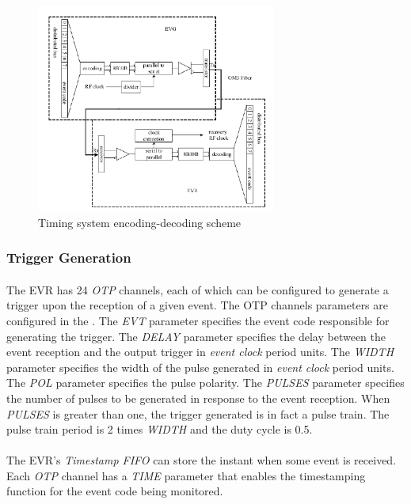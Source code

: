 \documentclass[openany]{article}
\begin{document}
			\begin{figure}[!h]
			\caption{Timing system encoding-decoding scheme}
			\label{fig:encoding-decoding}
			\centering
			\includegraphics[width=0.7\textwidth]{encoding-decoding-image}
			\end{figure}
\FloatBarrier

		\subsubsection{Trigger Generation}\label{sec:evr-trigger-generation}

			\paragraph{} The EVR has 24 \emph{OTP} channels, each of which can be configured to generate a trigger upon the reception of a given event. The OTP channels parameters are configured in the .
			The \emph{EVT} parameter specifies the event code responsible for generating the trigger.
			The \emph{DELAY} parameter specifies the delay between the event reception and the output trigger in \emph{event clock} period units.
			The \emph{WIDTH} parameter specifies the width of the pulse generated in \emph{event clock} period units.
			The \emph{POL} parameter specifies the pulse polarity.
			The \emph{PULSES} parameter specifies the number of pulses to be generated in response to the event reception. When \emph{PULSES} is greater than one, the trigger generated is in fact a pulse train. The pulse train period is 2 times \emph{WIDTH} and the duty cycle is 0.5.
			\paragraph{} The EVR's \emph{Timestamp FIFO} can store the instant when some event is received. Each \emph{OTP} channel has a \emph{TIME} parameter that enables the timestamping function for the event code being monitored.
\end{document}
